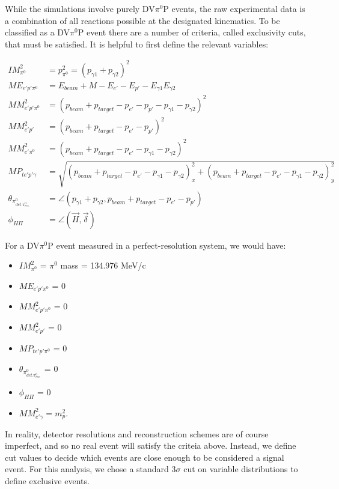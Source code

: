 While the simulations involve purely DV$\pi^0$P events, the raw experimental data is a combination of all reactions possible at the designated kinematics. To be classified as a DV$\pi^0$P event there are a number of criteria, called exclusivity cuts, that must be satisfied. It is helpful to first define the relevant variables:


\begin{align}
IM^{2}_{\pi^{0}} &= p^{2}_{\pi^{0}} = (p_{\gamma1} + p_{\gamma2})^{2}  \\
ME_{e'p'\pi^{0}} &= E_{beam} + M - E_{e'} - E_{p'} - E_{\gamma1}E_{\gamma2} \\
MM^{2}_{e'p'\pi^{0}} &= (p_{beam} + p_{target} - p_{e'} - p_{p'} - p_{\gamma1} - p_{\gamma2})^{2}  \\
MM^{2}_{e'p'} &= (p_{beam} + p_{target} - p_{e'} - p_{p'})^{2} \\
MM^{2}_{e'\pi^{0}} &= (p_{beam} + p_{target} - p_{e'} - p_{\gamma1} - p_{\gamma2})^{2} \\
MP_{te'p'\gamma} &= \sqrt{(p_{beam} + p_{target} - p_{e'} - p_{\gamma1} - p_{\gamma2})^{2}_{x} + (p_{beam} + p_{target} - p_{e'} - p_{\gamma1} - p_{\gamma2})^{2}_{y}}\\
\theta_{\pi^{0}_{det.\pi^{0}_{rec.}}} &= \angle(p_{\gamma1} + p_{\gamma2} , p_{beam} + p_{target} - p_{e'} - p_{p'}) \\
\phi_{H\Pi} &= \angle(\vec{H}, \vec{\delta})
\end{align}

For a DV$\pi^0$P event measured in a perfect-resolution system, we would have:
\begin{itemize}
    \item $IM^{2}_{\pi^{0}}$ = $\pi^0$ mass = 134.976 MeV/c 
    \item $ME_{e'p'\pi^{0}}$ = 0 
    \item $MM^{2}_{e'p'\pi^{0}}$ = 0 
    \item $MM^{2}_{e'p'}$ = 0 
    \item $MP_{te'p'\pi^{0}}$ = 0 
    \item $\theta_{\pi^{0}_{det.\pi^{0}_{rec.}}}$ = 0 
    \item $\phi_{H\Pi}$ = 0 
    \item $MM^{2}_{e'\gamma} = m^{2}_{p}$.
\end{itemize}


In reality, detector resolutions and reconstruction schemes are of course imperfect, and so no real event will satisfy the criteia above. Instead, we define cut values to decide which events are close enough to be considered a signal event.  For this analysis, we chose a standard 3$\sigma$ cut on variable distributions to define exclusive events. 


